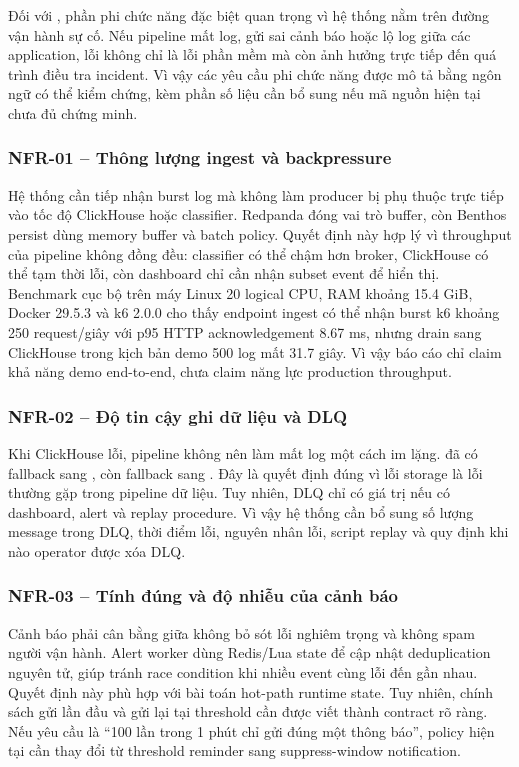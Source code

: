 Đối với \LogRider{}, phần phi chức năng đặc biệt quan trọng vì hệ thống nằm trên đường vận hành sự cố. Nếu pipeline mất log, gửi sai cảnh báo hoặc lộ log giữa các application, lỗi không chỉ là lỗi phần mềm mà còn ảnh hưởng trực tiếp đến quá trình điều tra incident. Vì vậy các yêu cầu phi chức năng được mô tả bằng ngôn ngữ có thể kiểm chứng, kèm phần số liệu cần bổ sung nếu mã nguồn hiện tại chưa đủ chứng minh.

\subsubsection{NFR-01 -- Thông lượng ingest và backpressure}

Hệ thống cần tiếp nhận burst log mà không làm producer bị phụ thuộc trực tiếp vào tốc độ ClickHouse hoặc classifier. Redpanda đóng vai trò buffer, còn Benthos persist dùng memory buffer và batch policy. Quyết định này hợp lý vì throughput của pipeline không đồng đều: classifier có thể chậm hơn broker, ClickHouse có thể tạm thời lỗi, còn dashboard chỉ cần nhận subset event để hiển thị. Benchmark cục bộ trên máy Linux 20 logical CPU, RAM khoảng 15.4 GiB, Docker 29.5.3 và k6 2.0.0 cho thấy endpoint ingest có thể nhận burst k6 khoảng 250 request/giây với p95 HTTP acknowledgement 8.67 ms, nhưng drain sang ClickHouse trong kịch bản demo 500 log mất 31.7 giây. Vì vậy báo cáo chỉ claim khả năng demo end-to-end, chưa claim năng lực production throughput.

\subsubsection{NFR-02 -- Độ tin cậy ghi dữ liệu và DLQ}

Khi ClickHouse lỗi, pipeline không nên làm mất log một cách im lặng.  đã có fallback sang , còn  fallback sang . Đây là quyết định đúng vì lỗi storage là lỗi thường gặp trong pipeline dữ liệu. Tuy nhiên, DLQ chỉ có giá trị nếu có dashboard, alert và replay procedure. Vì vậy hệ thống cần bổ sung số lượng message trong DLQ, thời điểm lỗi, nguyên nhân lỗi, script replay và quy định khi nào operator được xóa DLQ.

\subsubsection{NFR-03 -- Tính đúng và độ nhiễu của cảnh báo}

Cảnh báo phải cân bằng giữa không bỏ sót lỗi nghiêm trọng và không spam người vận hành. Alert worker dùng Redis/Lua state để cập nhật deduplication nguyên tử, giúp tránh race condition khi nhiều event cùng lỗi đến gần nhau. Quyết định này phù hợp với bài toán hot-path runtime state. Tuy nhiên, chính sách gửi lần đầu và gửi lại tại threshold cần được viết thành contract rõ ràng. Nếu yêu cầu là “100 lần trong 1 phút chỉ gửi đúng một thông báo”, policy hiện tại cần thay đổi từ threshold reminder sang suppress-window notification.


